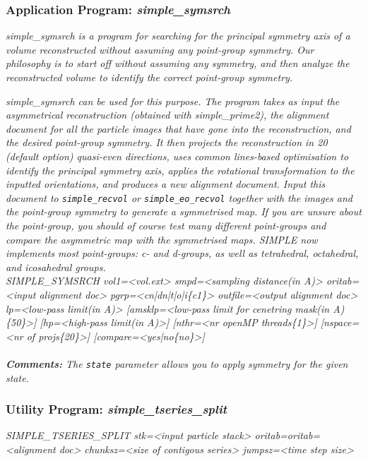 \documentclass[review]{elsarticle}
\begin{document}
{{{\subsubsection{Application Program: {\it{simple\_symsrch}}}
\label{symsrch}
{\it{simple\_symsrch} is a program for searching for the principal symmetry axis of a volume reconstructed without assuming any point-group symmetry. Our philosophy is to start off without assuming any symmetry, and then analyze the reconstructed volume to identify the correct point-group symmetry. {\it{simple\_symsrch} can be used for this purpose. The program takes as input the asymmetrical reconstruction (obtained with {\it{simple\_prime2}), the alignment document for all the particle images that have gone into the reconstruction, and the desired point-group symmetry. It then projects the reconstruction in 20 (default option) quasi-even directions, uses common lines-based optimisation to identify the principal symmetry axis, applies the rotational transformation to the inputted orientations, and produces a new alignment document. Input this document to \texttt{simple\_recvol} or \texttt{simple\_eo\_recvol} together with the images and the point-group symmetry to generate a symmetrised map. If you are unsure about the point-group, you should of course test many different point-groups and compare the asymmetric map with the symmetrised maps. SIMPLE now implements most point-groups: c- and d-groups, as well as tetrahedral, octahedral, and icosahedral groups.}\\
{\it{SIMPLE\_SYMSRCH vol1=<vol.ext> smpd=<sampling distance(in A)> oritab=<input}}
{\it{alignment doc> pgrp=<cn|dn|t|o|i\{c1\}> outfile=<output alignment doc>}}
{\it{lp=<low-pass limit(in A)> [amsklp=<low-pass limit for cenetring mask(in}}
{\it{A)\{50\}>] [hp=<high-pass limit(in A)>] [nthr=<nr openMP threads\{1\}>]}}
{\it{[nspace=<nr of projs\{20\}>] [compare=<yes|no\{no\}>]}}
\\\\
\noindent\textbf{Comments:} The \texttt{state} parameter allows you to apply symmetry for the given state.

\subsubsection{Utility Program: {\it{simple\_tseries\_split}}}
\label{tseries_split}
{\it{SIMPLE\_TSERIES\_SPLIT stk=<input particle stack> oritab=oritab=<alignment doc>}}
{\it{chunksz=<size of contigous series> jumpsz=<time step size>}}

}}}}}
\end{document}
